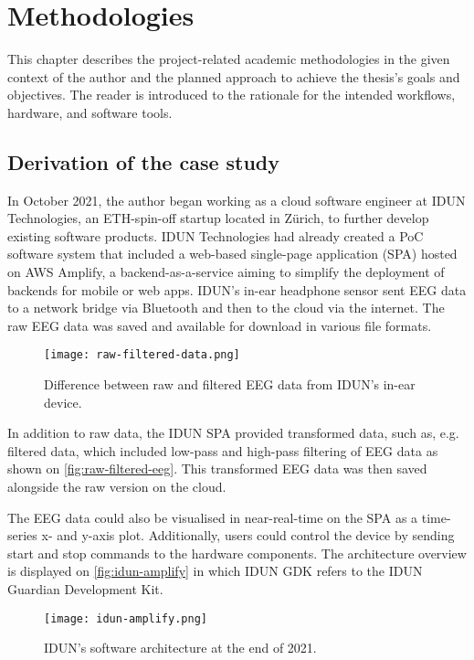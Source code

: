\chapter{Methodologies}
\graphicspath{{Chapter3/Figs/}{Chapter3/Figs/}}

This chapter describes the project-related academic methodologies in the given context of the author and the planned approach to achieve the thesis's goals and objectives. The reader is introduced to the rationale for the intended workflows, hardware, and software tools.

\section{Derivation of the case study}
\label{chapter3-derivation-of-the-case-study}

In October 2021, the author began working as a cloud software engineer at IDUN Technologies, an ETH-spin-off startup located in Zürich, to further develop existing software products. IDUN Technologies had already created a PoC software system that included a web-based single-page application (SPA) hosted on AWS Amplify, a backend-as-a-service aiming to simplify the deployment of backends for mobile or web apps. IDUN's in-ear headphone sensor sent EEG data to a network bridge via Bluetooth and then to the cloud via the internet. The raw EEG data was saved and available for download in various file formats.

\begin{figure}[!ht]
  \centering
  \texttt{[image: raw-filtered-data.png]}
  \caption{Difference between raw and filtered EEG data from IDUN's in-ear device.}
  \label{fig:raw-filtered-eeg}
\end{figure}

In addition to raw data, the IDUN SPA provided transformed data, such as, e.g. filtered data, which included low-pass and high-pass filtering of EEG data as shown on \autoref{fig:raw-filtered-eeg}. This transformed EEG data was then saved alongside the raw version on the cloud.

The EEG data could also be visualised in near-real-time on the SPA as a time-series x- and y-axis plot. Additionally, users could control the device by sending start and stop commands to the hardware components. The architecture overview is displayed on \autoref{fig:idun-amplify} in which IDUN GDK refers to the IDUN Guardian Development Kit.

\begin{figure}[!ht]
  \centering
  \texttt{[image: idun-amplify.png]}
  \caption{IDUN's software architecture at the end of 2021.}
  \label{fig:idun-amplify}
\end{figure}

